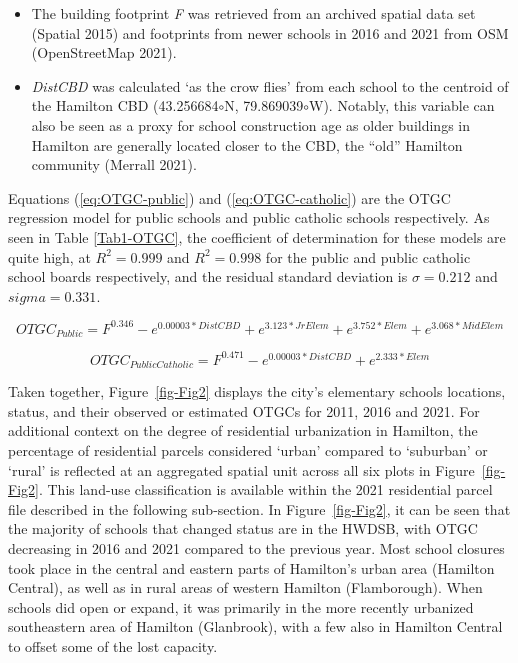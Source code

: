 \documentclass[
default
]{sn-jnl}
\begin{document}
\begin{itemize}
\item
  The building footprint \emph{F} was retrieved from an archived spatial
  data set (Spatial 2015) and footprints from newer schools in 2016 and
  2021 from OSM (OpenStreetMap 2021).
\item
  \emph{DistCBD} was calculated `as the crow flies' from each school to
  the centroid of the Hamilton CBD (43.256684\(\circ\)N,
  79.869039\(\circ\)W). Notably, this variable can also be seen as a
  proxy for school construction age as older buildings in Hamilton are
  generally located closer to the CBD, the ``old'' Hamilton community
  (Merrall 2021).
\end{itemize}

Equations (\ref{eq:OTGC-public}) and (\ref{eq:OTGC-catholic}) are the
OTGC regression model for public schools and public catholic schools
respectively. As seen in Table \ref{Tab1-OTGC}, the coefficient of
determination for these models are quite high, at \(R^2 = 0.999\) and
\(R^2 = 0.998\) for the public and public catholic school boards
respectively, and the residual standard deviation is \(\sigma = 0.212\)
and \(sigma = 0.331\).

\begin{equation}
\label{eq:OTGC-public}
OTGC_{Public} = F^{0.346}-e^{0.00003*DistCBD}+e^{3.123*JrElem}+e^{3.752*Elem}+ e^{3.068*MidElem} 
\end{equation}

\begin{equation}
\label{eq:OTGC-catholic}
OTGC_{Public Catholic} =F^{0.471}-e^{0.00003*DistCBD}+e^{2.333*Elem}
\end{equation}



Taken together, Figure~\ref{fig-Fig2} displays the city's elementary
schools locations, status, and their observed or estimated OTGCs for
2011, 2016 and 2021. For additional context on the degree of residential
urbanization in Hamilton, the percentage of residential parcels
considered `urban' compared to `suburban' or `rural' is reflected at an
aggregated spatial unit across all six plots in Figure~\ref{fig-Fig2}.
This land-use classification is available within the 2021 residential
parcel file described in the following sub-section. In
Figure~\ref{fig-Fig2}, it can be seen that the majority of schools that
changed status are in the HWDSB, with OTGC decreasing in 2016 and 2021
compared to the previous year. Most school closures took place in the
central and eastern parts of Hamilton's urban area (Hamilton Central),
as well as in rural areas of western Hamilton (Flamborough). When
schools did open or expand, it was primarily in the more recently
urbanized southeastern area of Hamilton (Glanbrook), with a few also in
Hamilton Central to offset some of the lost capacity.
\end{document}
